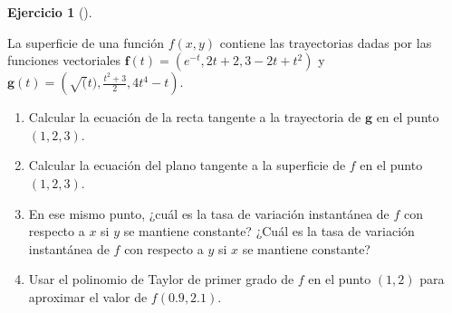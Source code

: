 \documentclass[
  a4paper,
]{scrreport}
\theoremstyle{definition}
\newtheorem{exercise}{Ejercicio}[chapter]
\theoremstyle{remark}
\begin{document}
\begin{exercise}[]\protect\hypertarget{exr-3}{}\label{exr-3}

La superficie de una función \(f(x,y)\) contiene las trayectorias dadas
por las funciones vectoriales \(\mathbf{f}(t)=(e^{-t}, 2t+2, 3-2t+t^2)\)
y \(\mathbf{g}(t)=\left(\sqrt(t), \frac{t^2+3}{2}, 4t^4-t\right)\).

\begin{enumerate}
\def\labelenumi{\alph{enumi}.}
\item
  Calcular la ecuación de la recta tangente a la trayectoria de
  \(\mathbf{g}\) en el punto \((1,2,3)\).
\item
  Calcular la ecuación del plano tangente a la superficie de \(f\) en el
  punto \((1,2,3)\).
\item
  En ese mismo punto, ¿cuál es la tasa de variación instantánea de \(f\)
  con respecto a \(x\) si \(y\) se mantiene constante? ¿Cuál es la tasa
  de variación instantánea de \(f\) con respecto a \(y\) si \(x\) se
  mantiene constante?
\item
  Usar el polinomio de Taylor de primer grado de \(f\) en el punto
  \((1,2)\) para aproximar el valor de \(f(0.9, 2.1)\).
\end{enumerate}

\end{exercise}
\end{document}
